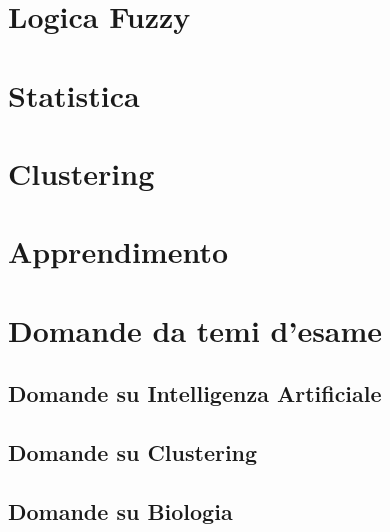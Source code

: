 \providecommand{\main}{.}





{\hypersetup{hidelinks}
  \tableofcontents  %
}

\chapter{Logica Fuzzy}


\chapter{Statistica}


\chapter{Clustering}


\chapter{Apprendimento}


\appendix
\chapter{Domande da temi d'esame}


\clearpage

\clearpage

\clearpage

\clearpage


\section{Domande su Intelligenza Artificiale}


\section{Domande su Clustering}


\section{Domande su Biologia}





